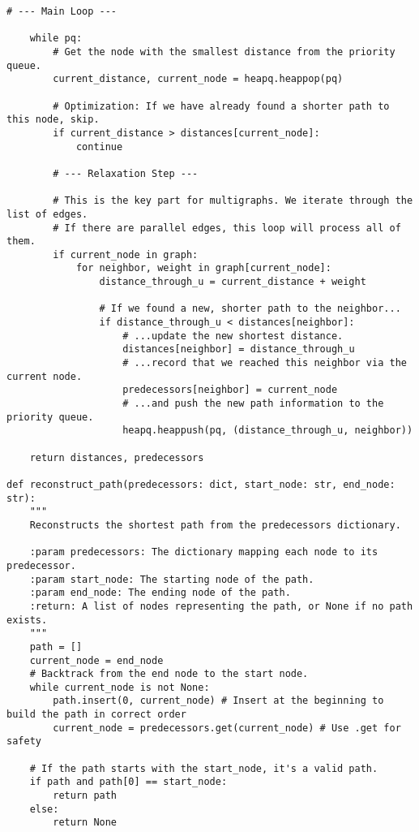 \documentclass[a4paper,12pt]{article}
\begin{document}
\begin{lstlisting}[style=pythonstyle, caption={Cài đặt Dijkstra cho đa đồ thị trong Python.}, label={lst:python_multi_full}]
    # --- Main Loop ---
    
    while pq:
        # Get the node with the smallest distance from the priority queue.
        current_distance, current_node = heapq.heappop(pq)
        
        # Optimization: If we have already found a shorter path to this node, skip.
        if current_distance > distances[current_node]:
            continue
            
        # --- Relaxation Step ---
        
        # This is the key part for multigraphs. We iterate through the list of edges.
        # If there are parallel edges, this loop will process all of them.
        if current_node in graph:
            for neighbor, weight in graph[current_node]:
                distance_through_u = current_distance + weight
                
                # If we found a new, shorter path to the neighbor...
                if distance_through_u < distances[neighbor]:
                    # ...update the new shortest distance.
                    distances[neighbor] = distance_through_u
                    # ...record that we reached this neighbor via the current node.
                    predecessors[neighbor] = current_node
                    # ...and push the new path information to the priority queue.
                    heapq.heappush(pq, (distance_through_u, neighbor))
                
    return distances, predecessors

def reconstruct_path(predecessors: dict, start_node: str, end_node: str):
    """
    Reconstructs the shortest path from the predecessors dictionary.

    :param predecessors: The dictionary mapping each node to its predecessor.
    :param start_node: The starting node of the path.
    :param end_node: The ending node of the path.
    :return: A list of nodes representing the path, or None if no path exists.
    """
    path = []
    current_node = end_node
    # Backtrack from the end node to the start node.
    while current_node is not None:
        path.insert(0, current_node) # Insert at the beginning to build the path in correct order
        current_node = predecessors.get(current_node) # Use .get for safety
    
    # If the path starts with the start_node, it's a valid path.
    if path and path[0] == start_node:
        return path
    else:
        return None



\end{lstlisting}
\end{document}
